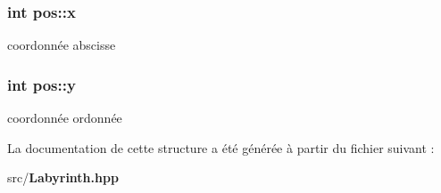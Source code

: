 \subsubsection[{x}]{\setlength{\rightskip}{0pt plus 5cm}int pos\-::x}\label{structpos_aac09c213542d5ffc796972c3c10e4d1c}


coordonnée abscisse 

\subsubsection[{y}]{\setlength{\rightskip}{0pt plus 5cm}int pos\-::y}\label{structpos_a8507e8245423d67f3bb29e2fa0f08054}


coordonnée ordonnée 



La documentation de cette structure a été générée à partir du fichier suivant \-:\begin{DoxyCompactItemize}
\item 
src/{\bf Labyrinth.\-hpp}\end{DoxyCompactItemize}
